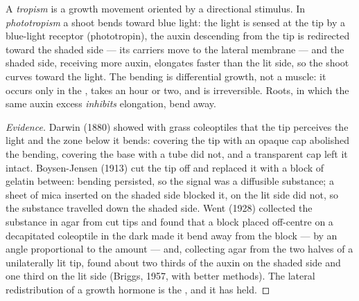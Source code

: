 \begin{proposition}[Phototropism]\label{prop:b2:plant-plasticity:phototropism}
A \emph{tropism} is a growth movement oriented by a directional
stimulus. In \emph{phototropism} a shoot bends toward blue light:
the light is sensed at the tip by a blue-light receptor
(phototropin), the auxin descending from the tip is redirected
toward the shaded side --- its carriers move to the lateral membrane
--- and the shaded side, receiving more auxin, elongates faster
than the lit side, so the shoot curves toward the light. The
bending is differential growth, not a muscle: it occurs only in
the , takes an hour or two, and is irreversible.
Roots, in which the same auxin excess \emph{inhibits} elongation,
bend away.
\end{proposition}
\begin{proof}[Evidence]
Darwin (1880) showed with grass coleoptiles that the tip perceives
the light and the zone below it bends: covering the tip with an
opaque cap abolished the bending, covering the base with a tube did
not, and a transparent cap left it intact. Boysen-Jensen (1913) cut
the tip off and replaced it with a block of gelatin between: bending
persisted, so the signal was a diffusible substance; a sheet of mica
inserted on the shaded side blocked it, on the lit side did not, so
the substance travelled down the shaded side. Went (1928) collected
the substance in agar from cut tips and found that a block placed
off-centre on a decapitated coleoptile in the dark made it bend
away from the block --- by an angle proportional to the amount ---
and, collecting agar from the two halves of a unilaterally lit tip,
found about two thirds of the auxin on the shaded side and one third
on the lit side (Briggs, 1957, with better methods). The lateral
redistribution of a growth hormone is the , and it has held.
\end{proof}

